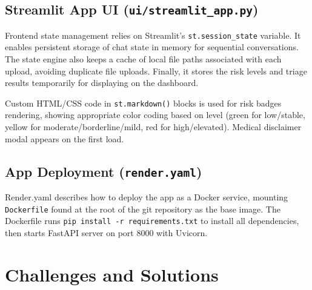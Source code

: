 \subsection{Streamlit App UI (\texttt{ui/streamlit\_app.py})}

Frontend state management relies on Streamlit's \texttt{st.session\_state} variable. It enables persistent storage of chat state in memory for sequential conversations. The state engine also keeps a cache of local file paths associated with each upload, avoiding duplicate file uploads. Finally, it stores the risk levels and triage results temporarily for displaying on the dashboard.

Custom HTML/CSS code in \texttt{st.markdown()} blocks is used for risk badges rendering, showing appropriate color coding based on level (green for low/stable, yellow for moderate/borderline/mild, red for high/elevated). Medical disclaimer modal appears on the first load.

\subsection{App Deployment (\texttt{render.yaml})}

Render.yaml describes how to deploy the app as a Docker service, mounting \texttt{Dockerfile} found at the root of the git repository as the base image. The Dockerfile runs \texttt{pip install -r requirements.txt} to install all dependencies, then starts FastAPI server on port 8000 with Uvicorn.

\section{Challenges and Solutions}

